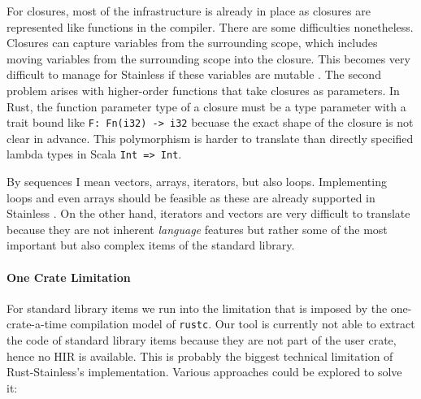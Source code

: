 For closures, most of the infrastructure is already in place as closures are
represented like functions in the compiler. There are some difficulties
nonetheless. Closures can capture variables from the surrounding scope, which
includes moving variables from the surrounding scope into the closure. This
becomes very difficult to manage for Stainless if these variables are mutable
\cite[section 3.4.3]{regb}. The second problem arises with higher-order
functions that take closures as parameters. In Rust, the function parameter type
of a closure must be a type parameter with a trait bound like
\passthrough{\lstinline!F: Fn(i32) -> i32!} becuase the exact shape of the
closure is not clear in advance. This polymorphism is harder to translate than
directly specified lambda types in Scala \passthrough{\lstinline!Int => Int!}.

By sequences I mean vectors, arrays, iterators, but also loops. Implementing
loops and even arrays should be feasible as these are already supported in
Stainless \cite[section ``Imperative'']{stainless-doc}. On the other hand,
iterators and vectors are very difficult to translate because they are not
inherent \emph{language} features but rather some of the most important but also
complex items of the standard library.


\paragraph{One Crate Limitation}

For standard library items we run into the limitation that is imposed by the
one-crate-a-time compilation model of \passthrough{\lstinline!rustc!}. Our tool
is currently not able to extract the code of standard library items because they
are not part of the user crate, hence no HIR is available. This is probably the
biggest technical limitation of Rust-Stainless's implementation. Various
approaches could be explored to solve it:

